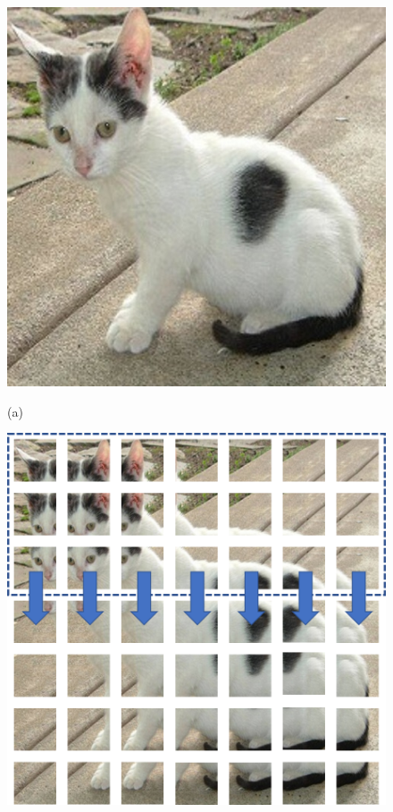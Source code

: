 \begin{figure}
	\begin{minipage}[b]{.4\linewidth}
		\centering
		\centerline{\includegraphics[width=\textwidth]{images/cat.jpg}}
		\centerline{(a)}\medskip
	\end{minipage}
	\hfill
	\begin{minipage}[b]{0.4\linewidth}
		\centering
		\centerline{\includegraphics[width=\textwidth]{images/cat_grid_v2.png}}

\end{minipage}
\end{figure}
